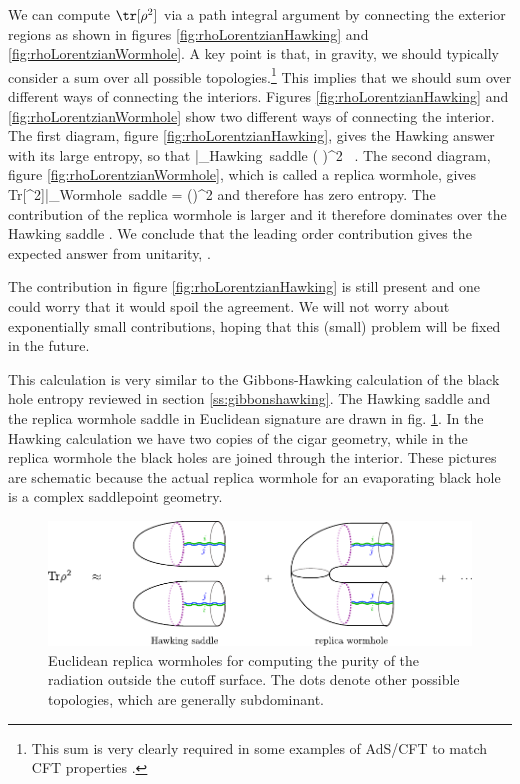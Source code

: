   
  We can compute $\tr[\rho^2]$ via a path integral argument by connecting the exterior regions as shown in figures \ref{fig:rhoLorentzianHawking} and \ref{fig:rhoLorentzianWormhole}. A key point is that, in gravity, we should typically consider a sum over all possible topologies.\footnote{ This sum is very clearly required in some examples of AdS/CFT to match CFT properties
  \cite{Witten:1998zw}.}   This implies that 
   we should sum over different ways of   connecting the interiors.  Figures \ref{fig:rhoLorentzianHawking} and  \ref{fig:rhoLorentzianWormhole} show two different ways of connecting the interior. The first diagram, 
   figure \ref{fig:rhoLorentzianHawking}, gives the Hawking answer with its large entropy, so that 
  \be \tr[\rho^2 ]|_{\rm Hawking~saddle}  \ll ( \tr[\rho])^2  \ .
  \ee 
    The second diagram, figure \ref{fig:rhoLorentzianWormhole}, which is called a replica wormhole, gives 
   \be {}
   Tr[\rho^2]|_{\rm Wormhole~saddle}  = (\tr[\rho])^2
   \ee
    and therefore has zero entropy. The contribution of the replica wormhole is larger and it therefore dominates over the Hawking saddle .      We conclude that the leading order contribution gives the expected answer from unitarity, . 

The contribution in figure \ref{fig:rhoLorentzianHawking} is still present and one could worry that it would spoil the agreement. We will not worry about exponentially small contributions,  hoping that this (small) problem will be fixed in the future. 
   
   This calculation is very similar to the Gibbons-Hawking calculation of the black hole entropy reviewed in section \ref{ss:gibbonshawking}. The Hawking saddle and the replica wormhole saddle in Euclidean signature are drawn in fig. \ref{fig:euclidean-wormholes}. In the Hawking calculation we have two copies of the cigar geometry, while in the replica wormhole the black holes are joined through the interior.  These pictures are schematic because the actual replica wormhole for an evaporating black hole is a complex saddlepoint geometry.
   
\begin{figure}
\begin{center}
\includegraphics[scale=1]{figures/euclidean-wormholes.pdf}
\end{center}
\caption{\small Euclidean replica wormholes for computing the purity of the radiation outside the cutoff surface. The dots denote other possible topologies, which are generally subdominant. \label{fig:euclidean-wormholes}}
\end{figure}     
   

